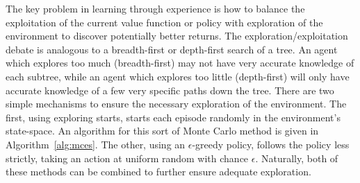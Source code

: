 The key problem in learning through experience is how to balance
the exploitation of the current value function or policy
with exploration of the environment to discover potentially better returns.
%
The exploration/exploitation debate is analogous to a breadth-first or
depth-first search of a tree.
%
An agent which explores too much (breadth-first)
may not have very accurate knowledge of each subtree,
while an agent which explores too little (depth-first)
will only have accurate
knowledge of a few very specific paths down the tree.
%
There are two simple mechanisms to ensure the necessary exploration of the
environment.
%
The first,
using exploring starts,
starts each episode randomly in the environment's state-space.
%
An algorithm for this sort of Monte Carlo method is given in
Algorithm~\ref{alg:mces}.
%
The other,
using an $\epsilon$-greedy policy,
follows the policy less strictly,
taking an action at uniform random with chance $\epsilon$.
%
Naturally,
both of these methods can be combined to further ensure adequate exploration.


